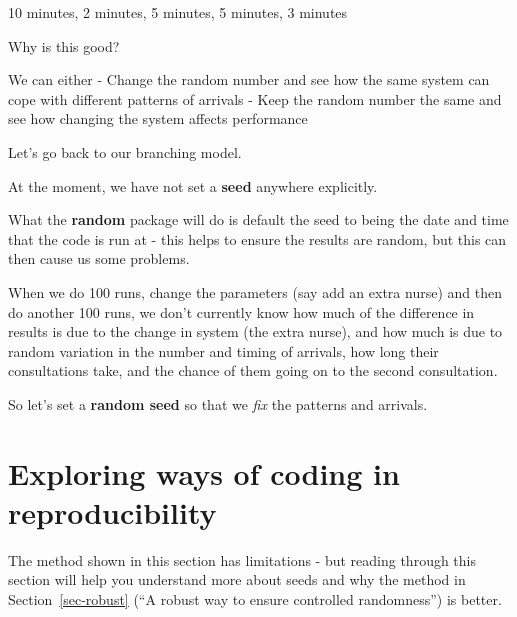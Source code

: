 \documentclass[
  letterpaper,
  DIV=11,
  numbers=noendperiod]{scrreprt}
\begin{document}
10 minutes, 2 minutes, 5 minutes, 5 minutes, 3 minutes

Why is this good?

We can either - Change the random number and see how the same system can
cope with different patterns of arrivals - Keep the random number the
same and see how changing the system affects performance

Let's go back to our branching model.

At the moment, we have not set a \textbf{seed} anywhere explicitly.

What the \textbf{random} package will do is default the seed to being
the date and time that the code is run at - this helps to ensure the
results are random, but this can then cause us some problems.

When we do 100 runs, change the parameters (say add an extra nurse) and
then do another 100 runs, we don't currently know how much of the
difference in results is due to the change in system (the extra nurse),
and how much is due to random variation in the number and timing of
arrivals, how long their consultations take, and the chance of them
going on to the second consultation.

So let's set a \textbf{random seed} so that we \emph{fix} the patterns
and arrivals.

\section{Exploring ways of coding in
reproducibility}\label{exploring-ways-of-coding-in-reproducibility}

\begin{tcolorbox}[enhanced jigsaw, rightrule=.15mm, colback=white, colframe=quarto-callout-warning-color-frame, colbacktitle=quarto-callout-warning-color!10!white, toprule=.15mm, coltitle=black, opacityback=0, titlerule=0mm, bottomtitle=1mm, breakable, title=\textcolor{quarto-callout-warning-color}{\faExclamationTriangle}\hspace{0.5em}{Warning}, opacitybacktitle=0.6, toptitle=1mm, arc=.35mm, bottomrule=.15mm, leftrule=.75mm, left=2mm]

The method shown in this section has limitations - but reading through
this section will help you understand more about seeds and why the
method in Section~\ref{sec-robust} (``A robust way to ensure controlled
randomness'') is better.

\end{tcolorbox}
\end{document}
